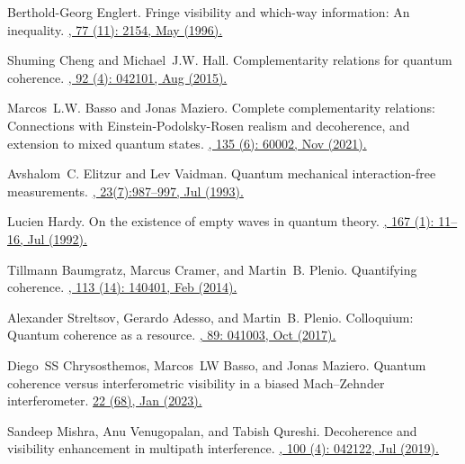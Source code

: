 \documentclass[letterpaper,onecolumn,12pt,accepted=2024-01-17]{article}
\begin{document}
\begin{thebibliography}{100}
Berthold-Georg Englert.
\newblock Fringe visibility and which-way information: An inequality.
\href{https://doi.org/10.1103/PhysRevLett.77.2154}{, 77 (11): 2154, May (1996).}

Shuming Cheng and Michael~J.W. Hall.
\newblock Complementarity relations for quantum coherence.
\href{https://doi.org/10.1103/PhysRevA.92.042101}{, 92 (4): 042101, Aug (2015).}

Marcos~L.W. Basso and Jonas Maziero.
\newblock Complete complementarity relations: Connections with
  {E}instein-{P}odolsky-{R}osen realism and decoherence, and extension to mixed
  quantum states.
\href{http://dx.doi.org/10.1209/0295-5075/ac1bc8}{, 135 (6): 60002, Nov (2021).}

Avshalom~C. Elitzur and Lev Vaidman.
\newblock Quantum mechanical interaction-free measurements.
\href{https://doi.org/10.1007/BF00736012}{, 23(7):987--997, Jul (1993).}

Lucien Hardy.
\newblock On the existence of empty waves in quantum theory.
\href{https://doi.org/10.1016/0375-9601(92)90618-V}{, 167 (1): 11--16, Jul (1992).}

Tillmann Baumgratz, Marcus Cramer, and Martin~B. Plenio.
\newblock Quantifying coherence.
\href{https://doi.org/10.1103/PhysRevLett.113.140401}{, 113 (14): 140401, Feb (2014).}

Alexander Streltsov, Gerardo Adesso, and Martin~B. Plenio.
\newblock Colloquium: Quantum coherence as a resource.
\href{https://doi.org/10.1103/RevModPhys.89.041003}{, 89: 041003, Oct (2017).}

Diego~SS Chrysosthemos, Marcos~LW Basso, and Jonas Maziero.
\newblock Quantum coherence versus interferometric visibility in a biased Mach–Zehnder interferometer.
\href{https://doi.org/10.1007/s11128-022-03800-6}{ 22 (68), Jan (2023).}

Sandeep Mishra, Anu Venugopalan, and Tabish Qureshi.
\newblock Decoherence and visibility enhancement in multipath interference.
\href{https://doi.org/10.1103/PhysRevA.100.042122}{, 100 (4): 042122, Jul (2019).}


\end{thebibliography}
\end{document}
